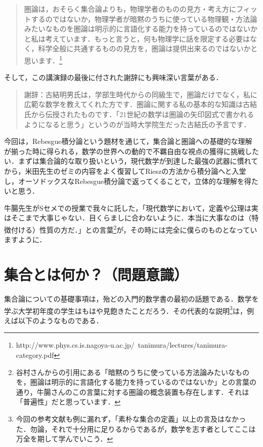 \documentclass[uplatex, 12pt, a4paper, dvipdfmx]{jsreport}
\begin{document}
\begin{quote}
圏論は，おそらく集合論よりも，物理学者のものの見方・考え方にフィットするのではないか，物理学者が暗黙のうちに使っている物理観・方法論みたいなものを圏論は明示的に言語化する能力を持っているのではないかと私は考えています．もっと言うと，何も物理学に話を限定する必要はなく，科学全般に共通するものの見方を，圏論は提供出来るのではないかと思います．\footnote{http://www.phys.cs.is.nagoya-u.ac.jp/~tanimura/lectures/tanimura-category.pdf}
\end{quote}

そして，この講演録の最後に付された謝辞にも興味深い言葉がある．

\begin{quote}
	謝辞：古結明男氏は，学部生時代からの同級生で，圏論だけでなく，私に広範な数学を教えてくれた方です．圏論に関する私の基本的な知識は古結氏から伝授されたものです．「21世紀の数学は圏論の矢印図式で書かれるようになると思う」というのが当時大学院生だった古結氏の予言です．
\end{quote}

今回は，Rebesgue積分論という題材を通じて，集合論と圏論への基礎的な理解が揃った時に得られる，数学の世界への動的で不羈自由な視点の獲得に挑戦したい．まずは集合論的な取り扱いという，現代数学が到達した最強の武器に慣れてから，米田先生のゼミの内容をよく復習してRieszの方法から積分論へと入堂し，オーソドックスなRebesgue積分論で返ってくることで，立体的な理解を得たいと思う．\par


牛腸先生がSセメでの授業で我々に託した，「現代数学において，定義や公理は実はそこまで大事じゃない．目くらましに合わないように．本当に大事なのは（特徴付ける）性質の方だ．」との言葉\footnote{谷村さんからの引用にある「暗黙のうちに使っている方法論みたいなものを，圏論は明示的に言語化する能力を持っているのではないか」との言葉の通り，牛腸さんのこの言葉に対する圏論の概念装置も存在します．それは「普遍性」だと思っています．}が，その時には完全に僕らのものとなっていますように．

\section{集合とは何か？（問題意識）}

集合論についての基礎事項は，殆どの入門的数学書の最初の話題である．数学を学ぶ大学初年度の学生はもはや見飽きたことだろう．その代表的な説明\footnote{今回の参考文献\cite{吉田洋一}\cite{須之内治男}も例に漏れず，「素朴な集合の定義」以上の言及はなかった．勿論，それで十分用に足りるからであるが，数学を志す者としてここは万全を期して学んでいこう．}は，例えば以下のようなものである．
\end{document}
